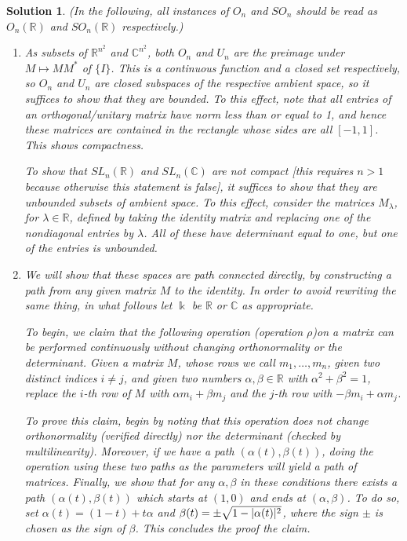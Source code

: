 \documentclass{article}
\theoremstyle{nonumberplain}
\newtheorem{sol}{Solution}
\newcommand{\R}{\mathbb{R}}
\newcommand{\C}{\mathbb{C}}
\newcommand{\kk}{\Bbbk}
\DeclarePairedDelimiter{\abs}{\lvert}{\rvert}
\begin{document}
\begin{sol} (In the following, all instances of $O_n$ and $SO_n$ should be read as $O_n(\R)$ and $SO_n(\R)$ respectively.)
\begin{enumerate}
\item As subsets of $\R^{n^2}$ and $\C^{n^2}$, both $O_n$ and $U_n$ are the preimage under $M \mapsto M M^*$ of $\{I\}$. This is a continuous function and a closed set respectively, so $O_n$ and $U_n$ are closed subspaces of the respective ambient space, so it suffices to show that they are bounded. To this effect, note that all entries of an orthogonal/unitary matrix have norm less than or equal to 1, and hence these matrices are contained in the rectangle whose sides are all $[-1,1]$. This shows compactness.

To show that $SL_n(\R)$ and $SL_n(\C)$ are not compact [this requires $n > 1$ because otherwise this statement is false], it suffices to show that they are unbounded subsets of ambient space. To this effect, consider the matrices $M_\lambda$, for $\lambda \in \R$, defined by taking the identity matrix and replacing one of the nondiagonal entries by $\lambda$. All of these have determinant equal to one, but one of the entries is unbounded.

\item We will show that these spaces are path connected directly, by constructing a path from any given matrix $M$ to the identity. In order to avoid rewriting the same thing, in what follows let $\kk$ be $\R$ or $\C$ as appropriate.

To begin, we claim that the following operation (operation $\rho$)on a matrix can be performed continuously without changing orthonormality or the determinant. Given a matrix $M$, whose rows we call $m_1, \dots, m_n$, given two distinct indices $i \neq j$, and given two numbers $\alpha, \beta \in \R$ with $\alpha^2 + \beta^2 = 1$, replace the $i$-th row of $M$ with $\alpha m_i + \beta m_j$ and the $j$-th row with $-\beta m_i + \alpha m_j$.

To prove this claim, begin by noting that this operation does not change orthonormality (verified directly) nor the determinant (checked by multilinearity). Moreover, if we have a path $(\alpha(t), \beta(t))$, doing the operation using these two paths as the parameters will yield a path of matrices. Finally, we show that for any $\alpha, \beta$ in these conditions there exists a path $(\alpha(t),\beta(t))$ which starts at $(1,0)$ and ends at $(\alpha,\beta)$.  To do so, set $\alpha(t) = (1-t) + t \alpha$ and $\beta(t) = \pm\sqrt{1 - \abs{\alpha(t)}^2}$, where the sign $\pm$ is chosen as the sign of $\beta$. This concludes the proof the claim.


\end{enumerate}
\end{sol}
\end{document}
